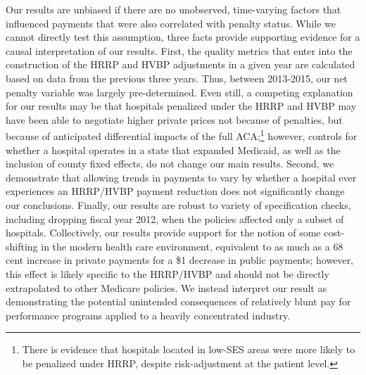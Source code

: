 \documentclass[12pt]{article}
\begin{document}
Our results are unbiased if there are no unobserved, time-varying factors that influenced payments that were also correlated with penalty status.  While we cannot directly test this assumption, three facts provide supporting evidence for a causal interpretation of our results.  First, the quality metrics that enter into the construction of the HRRP and HVBP adjustments in a given year are calculated based on data from the previous three years.  Thus, between 2013-2015, our net penalty variable was largely pre-determined. Even still, a competing explanation for our results may be that hospitals penalized under the HRRP and HVBP may have been able to negotiate higher private prices not because of penalties, but because of anticipated differential impacts of the full ACA;\footnote{There is evidence that hospitals located in low-SES areas were more likely to be penalized under HRRP, despite risk-adjustment at the patient level.} however, controls for whether a hospital operates in a state that expanded Medicaid, as well as the inclusion of county fixed effects, do not change our main results. Second, we demonstrate that allowing trends in payments to vary by whether a hospital ever experiences an HRRP/HVBP payment reduction does not significantly change our conclusions. Finally, our results are robust to variety of specification checks, including dropping fiscal year 2012, when the policies affected only a subset of hospitals. Collectively, our results provide support for the notion of some cost-shifting in the modern health care environment, equivalent to as much as a 68 cent increase in private payments for a \$1 decrease in public payments; however, this effect is likely specific to the HRRP/HVBP and should not be directly extrapolated to other Medicare policies. We instead interpret our result as demonstrating the potential unintended consequences of relatively blunt pay for performance programs applied to a heavily concentrated industry.
\end{document}
